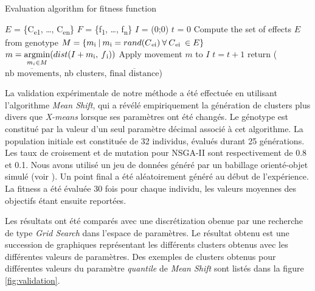 \documentclass{llncs}
\newcommand{\textoverline}[1]{$\overline{\mbox{#1}}$}
\begin{document}
      \begin{algorithm}[H]
      \caption{Evaluation algorithm for fitness function}\label{euclid}
        \begin{algorithmic}[1]
          \State $E$ = \{C\textsubscript{e1}, \dots, C\textsubscript{en}\} 
          \State $F$ = \{f\textsubscript{1}, \dots, f\textsubscript{n}\} 
          \State $I$ = (0;0) 
          \State $t$ = 0 
          \State Compute the set of effects $E$ from genotype
                  \State $M = \{ m\textsubscript{i}\:|\:m\textsubscript{i} = rand(C\textsubscript{ei})\:\forall\:C\textsubscript{ei}\:\in E\}$
                  \State $m = \operatornamewithlimits{argmin}\limits_{m_i \in M}(dist(I+m\textsubscript{i},\:f\textsubscript{i}))$
                  \State Apply movement $m$ to $I$
                  \State $t = t + 1$
                \EndWhile
              \EndFor
            \EndFor
            \State return (\textoverline{nb movements}, nb clusters, \textoverline{final distance})
        \end{algorithmic}
      \end{algorithm}

La validation expérimentale de notre méthode a été effectuée en utilisant l'algorithme \textit{Mean Shift}, qui a révélé empiriquement la génération de clusters plus divers que \textit{X-means} lorsque ses paramètres ont été changés. Le génotype est constitué par la valeur d'un seul paramètre décimal associé à cet algorithme. La population initiale est constituée de 32 individus, évalués durant 25 générations. Les taux de croisement et de mutation pour NSGA-II sont respectivement de 0.8 et 0.1. Nous avons utilisé un jeu de données généré par un babillage orienté-objet simulé (voir ). Un point final a été aléatoirement généré au début de l'expérience. La fitness a été évaluée 30 fois pour chaque individu, les valeurs moyennes des objectifs étant ensuite reportées.

Les résultats ont été comparés avec une discrétization obenue par une recherche de type \textit{Grid Search} dans l'espace de paramètres. Le résultat obtenu est une succession de graphiques représentant les différents clusters obtenus avec les différentes valeurs de paramètres. Des exemples de clusters obtenus pour différentes valeurs du paramètre \textit{quantile} de \textit{Mean Shift} sont listés dans la figure \ref{fig:validation}.
\end{document}
